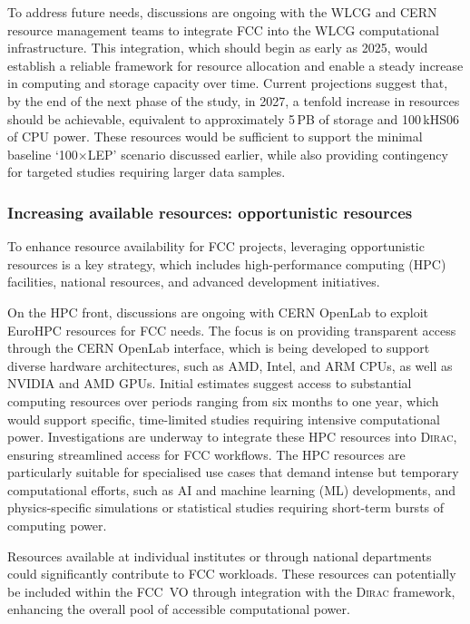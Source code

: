 To address future needs, 
discussions are ongoing with the WLCG and CERN resource management teams to integrate FCC into the WLCG computational infrastructure. 
This integration, which should begin as early as 2025, 
would establish a reliable framework for resource allocation and enable a steady increase in computing and storage capacity over time. 
Current projections suggest that, by the end of the next phase of the study, in 2027, 
a tenfold increase in resources should be achievable, equivalent to approximately 5\,PB of storage and 100\,kHS06 of CPU power. 
These resources would be sufficient to support the minimal baseline `100$\times$LEP' scenario discussed earlier, 
while also providing contingency for targeted studies requiring larger data samples.

\subsubsection{Increasing available resources: opportunistic resources}

To enhance resource availability for FCC projects, leveraging opportunistic resources is a key strategy, which includes high-performance computing (HPC) facilities, national resources, and advanced development initiatives.

On the HPC front, discussions are ongoing with CERN OpenLab to exploit EuroHPC resources for FCC needs. 
The focus is on providing transparent access through the CERN OpenLab interface, 
which is being developed to support diverse hardware architectures, such as AMD, Intel, and ARM CPUs, as well as NVIDIA and AMD GPUs.
Initial estimates suggest access to substantial computing resources over periods ranging from six months to one year, 
which would support specific, time-limited studies requiring intensive computational power.
Investigations are underway to integrate these HPC resources into \textsc{Dirac}, ensuring streamlined access for FCC workflows.
The HPC resources are particularly suitable for specialised use cases that demand intense but temporary computational efforts, 
such as AI and machine learning (ML) developments, and
physics-specific simulations or statistical studies requiring short-term bursts of computing power.

Resources available at individual institutes or through national departments could significantly contribute to FCC workloads. 
These resources can potentially be included within the FCC~VO through integration with the \textsc{Dirac} framework, 
enhancing the overall pool of accessible computational power.

